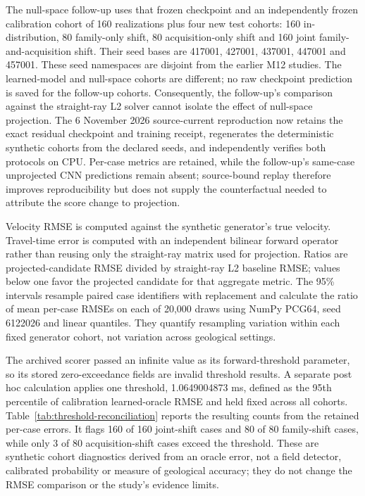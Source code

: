 \documentclass[11pt]{article}
\begin{document}
The null-space follow-up uses that frozen checkpoint and an independently frozen calibration cohort of 160 realizations plus four new test cohorts: 160 in-distribution, 80 family-only shift, 80 acquisition-only shift and 160 joint family-and-acquisition shift. Their seed bases are 417001, 427001, 437001, 447001 and 457001. These seed namespaces are disjoint from the earlier M12 studies. The learned-model and null-space cohorts are different; no raw checkpoint prediction is saved for the follow-up cohorts. Consequently, the follow-up's comparison against the straight-ray L2 solver cannot isolate the effect of null-space projection. The 6 November 2026 source-current reproduction now retains the exact residual checkpoint and training receipt, regenerates the deterministic synthetic cohorts from the declared seeds, and independently verifies both protocols on CPU. Per-case metrics are retained, while the follow-up's same-case unprojected CNN predictions remain absent; source-bound replay therefore improves reproducibility but does not supply the counterfactual needed to attribute the score change to projection.

Velocity RMSE is computed against the synthetic generator's true velocity. Travel-time error is computed with an independent bilinear forward operator rather than reusing only the straight-ray matrix used for projection. Ratios are projected-candidate RMSE divided by straight-ray L2 baseline RMSE; values below one favor the projected candidate for that aggregate metric. The 95\% intervals resample paired case identifiers with replacement and calculate the ratio of mean per-case RMSEs on each of 20,000 draws using NumPy PCG64, seed 6122026 and linear quantiles. They quantify resampling variation within each fixed generator cohort, not variation across geological settings.

The archived scorer passed an infinite value as its forward-threshold parameter, so its stored zero-exceedance fields are invalid threshold results. A separate post hoc calculation applies one threshold, 1.0649004873 ms, defined as the 95th percentile of calibration learned-oracle RMSE and held fixed across all cohorts. Table~\ref{tab:threshold-reconciliation} reports the resulting counts from the retained per-case errors. It flags 160 of 160 joint-shift cases and 80 of 80 family-shift cases, while only 3 of 80 acquisition-shift cases exceed the threshold. These are synthetic cohort diagnostics derived from an oracle error, not a field detector, calibrated probability or measure of geological accuracy; they do not change the RMSE comparison or the study's evidence limits.
\end{document}
